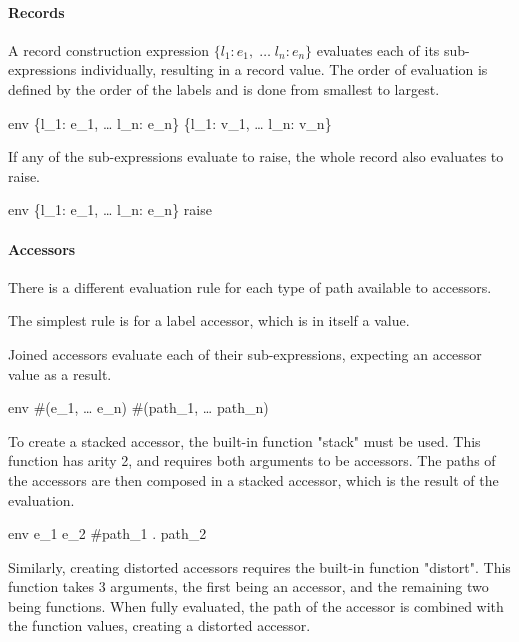 \documentclass{article}
\begin{document}
\paragraph{Records}
A record construction expression $\{l_1: e_1, \; \dots \; l_n: e_n\}$ evaluates each of its sub-expressions individually, resulting in a record value.
The order of evaluation is defined by the order of the labels and is done from smallest to largest.

    {\mbox{env} \vdash \{l_1: e_1, \; \dots \; l_n: e_n\} \Downarrow \{l_1: v_1, \; \dots \; l_n: v_n\}}

If any of the sub-expressions evaluate to raise, the whole record also evaluates to raise.

    {\mbox{env} \vdash \{l_1: e_1, \; \dots \; l_n: e_n\} \Downarrow raise}

\paragraph{Accessors}

There is a different evaluation rule for each type of path available to accessors.

The simplest rule is for a label accessor, which is in itself a value.


Joined accessors evaluate each of their sub-expressions, expecting an accessor value as a result.

    {\mbox{env} \vdash \#(e_1, \; \dots \; e_n) \Downarrow \#(path_1, \; \dots \; path_n)}

To create a stacked accessor, the built-in function "stack" must be used.
This function has arity 2, and requires both arguments to be accessors.
The paths of the accessors are then composed in a stacked accessor, which is the result of the evaluation.

    {\mbox{env} \vdash e_1 \; e_2 \Downarrow \#path_1 \; . \; path_2}

Similarly, creating distorted accessors requires the built-in function "distort".
This function takes 3 arguments, the first being an accessor, and the remaining two being functions.
When fully evaluated, the path of the accessor is combined with the function values, creating a distorted accessor.
\end{document}
